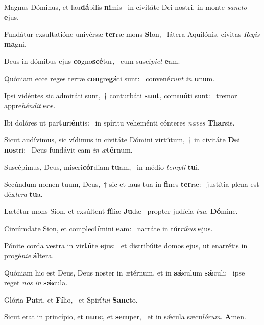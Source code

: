 \item Magnus Dóminus, et lau\textbf{dá}bilis \textbf{ni}mis~\psstar{} in civitáte Dei nostri, in monte \textit{sancto} \textbf{e}jus.
\item Fundátur exsultatióne univérsæ \textbf{ter}ræ mons \textbf{Si}on,~\psstar{} látera Aquilónis, cívitas \textit{Regis} \textbf{ma}gni.
\item Deus in dómibus ejus \textbf{co}gno\textbf{scé}tur,~\psstar{} cum suscí\textit{piet} \textbf{e}am.
\item Quóniam ecce reges terræ \textbf{con}gre\textbf{gá}ti sunt:~\psstar{} convené\textit{runt} \textit{in} \textbf{u}num.
\item Ipsi vidéntes sic admiráti sunt,~† conturbáti \textbf{sunt}, com\textbf{mó}ti sunt:~\psstar{} tremor appre\textit{héndit} \textbf{e}os.
\item Ibi dolóres ut par\textbf{tu}ri\textbf{én}tis:~\psstar{} in spíritu veheménti cónteres \textit{naves} \textbf{Thar}sis.
\item Sicut audívimus, sic vídimus in civitáte Dómini virtútum,~† in civitáte \textbf{De}i \textbf{nos}tri:~\psstar{} Deus fundávit eam \textit{in} \textit{æ}\textbf{tér}num.
\item Suscépimus, Deus, miseri\textbf{cór}diam \textbf{tu}am,~\psstar{} in médio \textit{templi} \textbf{tu}i.
\item Secúndum nomen tuum, Deus,~† sic et laus tua in \textbf{fi}nes \textbf{ter}ræ:~\psstar{} justítia plena est déx\textit{tera} \textbf{tu}a.
\item Lætétur mons Sion, et exsúltent \textbf{fí}liæ \textbf{Ju}dæ~\psstar{} propter judícia \textit{tua}, \textbf{Dó}mine.
\item Circúmdate Sion, et complec\textbf{tí}mini \textbf{e}am:~\psstar{} narráte in túr\textit{ribus} \textbf{e}jus.
\item Pónite corda vestra in vir\textbf{tú}te \textbf{e}jus:~\psstar{} et distribúite domos ejus, ut enarrétis in progé\textit{nie} \textbf{ál}tera.
\item Quóniam hic est Deus, Deus noster in ætérnum, et in \textbf{sǽ}culum \textbf{sǽ}culi:~\psstar{} ipse reget \textit{nos} \textit{in} \textbf{sǽ}cula.
\item Glória \textbf{Pa}tri, et \textbf{Fí}lio,~\psstar{} et Spirí\textit{tui} \textbf{Sanc}to.
\item Sicut erat in princípio, et \textbf{nunc}, et \textbf{sem}per,~\psstar{} et in sǽcula sæcu\textit{lórum}. \textbf{A}men.